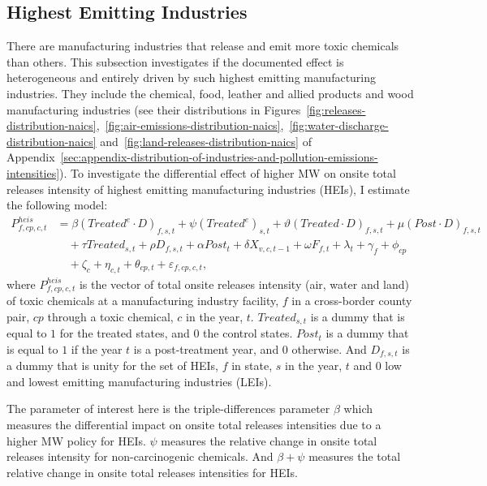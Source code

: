 \documentclass[numsec,webpdf,contemporary,large,namedate]{oup-authoring-template}%
\begin{document}
    \subsection{Highest Emitting Industries}\label{subsec:highest-emitting-industries}
    There are manufacturing industries that release and emit more toxic chemicals than others. This subsection investigates if the documented effect is heterogeneous and entirely driven by such highest emitting manufacturing industries. They include the chemical, food, leather and allied products and wood manufacturing industries (see their distributions in Figures~\ref{fig:releases-distribution-naics},~\ref{fig:air-emissions-distribution-naics},~\ref{fig:water-discharge-distribution-naics} and~\ref{fig:land-releases-distribution-naics} of Appendix~\ref{sec:appendix-distribution-of-industries-and-pollution-emissions-intensities}). To investigate the differential effect of higher MW on onsite total releases intensity of highest emitting manufacturing industries (HEIs), I estimate the following model:
    \begin{align}
        P_{f,cp,c,t}^{heis} &= \beta (Treated^{e} \cdot D)_{f,s,t} + \psi (Treated^{e})_{s,t} + \vartheta (Treated \cdot D)_{f,s,t} + \mu (Post \cdot D)_{f,s,t} \nonumber \\
        &\quad + \tau Treated_{s,t} + \rho D_{f,s,t} + \alpha Post_{t} + \delta X_{v,c,t-1} + \omega F_{f,t} + \lambda_{t} + \gamma_{f} + \phi_{cp} \nonumber \\
        &\quad + \zeta_{c} + \eta_{c,t} + \theta_{cp,t} + \varepsilon_{f,cp,c,t},\label{eq:heterogeneous-onsite-releases-intensity-heis}
    \end{align}
    where $P_{f,cp,c,t}^{heis}$ is the vector of total onsite releases intensity (air, water and land) of toxic chemicals at a manufacturing industry facility, $f$ in a cross-border county pair, $cp$ through a toxic chemical, $c$ in the year, $t$. $Treated_{s,t}$ is a dummy that is equal to $1$ for the treated states, and $0$ the control states. $Post_{t}$ is a dummy that is equal to $1$ if the year $t$ is a post-treatment year, and $0$ otherwise. And $D_{f,s,t}$ is a dummy that is unity for the set of HEIs, $f$ in state, $s$ in the year, $t$ and $0$ low and lowest emitting manufacturing industries (LEIs).
    

    The parameter of interest here is the triple-differences parameter $\beta$ which measures the differential impact on onsite total releases intensities due to a higher MW policy for HEIs. $\psi$ measures the relative change in onsite total releases intensity for non-carcinogenic chemicals. And $\beta + \psi$ measures the total relative change in onsite total releases intensities for HEIs.
\end{document}
